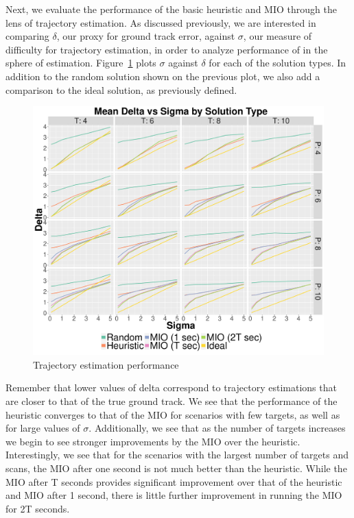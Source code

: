 Next, we evaluate the performance of the basic heuristic and MIO through the lens of trajectory estimation. As discussed previously, we are interested in comparing $\delta$, our proxy for ground track error, against $\sigma$, our measure of difficulty for trajectory estimation, in order to analyze performance of in the sphere of estimation. Figure~\ref{Fig:Basic_Delta_Summary} plots $\sigma$ against $\delta$ for each of the solution types. In addition to the random solution shown on the previous plot, we also add a comparison to the ideal solution, as previously defined.
\begin{figure}[ht]
  \centering
  \includegraphics[width=\columnwidth]{../Figures/Basic_Delta_Summary}
  \caption{Trajectory estimation performance}
  \label{Fig:Basic_Delta_Summary}
\end{figure}

Remember that lower values of delta correspond to trajectory estimations that are closer to that of the true ground track. We see that the performance of the heuristic converges to that of the MIO for scenarios with few targets, as well as for large values of $\sigma$. Additionally, we see that as the number of targets increases we begin to see stronger improvements by the MIO over the heuristic. Interestingly, we see that for the scenarios with the largest number of targets and scans, the MIO after one second is not much better than the heuristic. While the MIO after T seconds provides significant improvement over that of the heuristic and MIO after 1 second, there is little further improvement in running the MIO for 2T seconds. 

